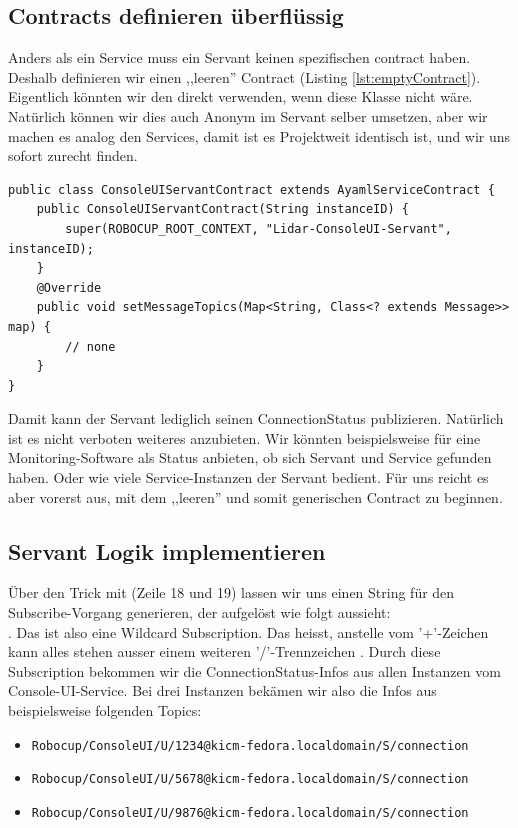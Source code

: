\subsection{Contracts definieren überflüssig}
Anders als ein Service muss ein Servant keinen spezifischen \Gls{contract} haben. Deshalb definieren wir einen ,,leeren'' Contract (Listing \ref{lst:emptyContract}). Eigentlich könnten wir den  direkt verwenden, wenn diese Klasse nicht  wäre. Natürlich können wir dies auch Anonym im Servant selber umsetzen, aber wir machen es analog den Services, damit ist es Projektweit identisch ist, und wir uns sofort zurecht finden.
\begin{lstlisting}[caption={,,leerer Contract'' für den Servant},label={lst:emptyContract}]
public class ConsoleUIServantContract extends AyamlServiceContract {
    public ConsoleUIServantContract(String instanceID) {
        super(ROBOCUP_ROOT_CONTEXT, "Lidar-ConsoleUI-Servant", instanceID);
    }
    @Override
    public void setMessageTopics(Map<String, Class<? extends Message>> map) {
        // none
    }
}
\end{lstlisting}
Damit kann der Servant lediglich seinen ConnectionStatus publizieren. Natürlich ist es nicht verboten weiteres anzubieten. Wir könnten beispielsweise für eine Monitoring-Software als Status anbieten, ob sich Servant und Service gefunden haben. Oder wie viele Service-Instanzen der Servant bedient. Für uns reicht es aber vorerst aus, mit dem ,,leeren'' und somit generischen Contract zu beginnen.

\subsection{Servant Logik implementieren}
Über den Trick mit  (Zeile 18 und 19) lassen wir uns einen String für den Subscribe-Vorgang generieren, der aufgelöst wie folgt aussieht: \\ . Das ist also eine Wildcard Subscription. Das heisst, anstelle vom '+'-Zeichen kann alles stehen ausser einem weiteren '/'-Trennzeichen .
Durch diese Subscription bekommen wir die ConnectionStatus-Infos aus allen Instanzen vom Console-UI-Service. Bei drei Instanzen bekämen wir also die Infos aus beispielsweise folgenden Topics:
\begin{itemize}
	\item \texttt{Robocup/ConsoleUI/U/1234@kicm-fedora.localdomain/S/connection}
	\item \texttt{Robocup/ConsoleUI/U/5678@kicm-fedora.localdomain/S/connection}
	\item \texttt{Robocup/ConsoleUI/U/9876@kicm-fedora.localdomain/S/connection}
\end{itemize}

